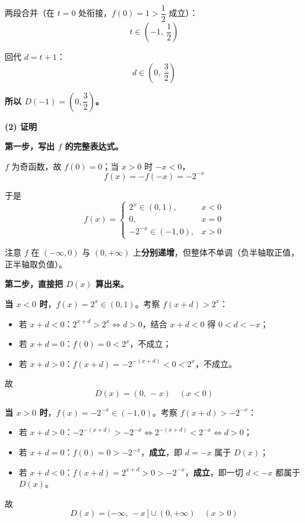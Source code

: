 \begin{answer}
两段合并（在 $t=0$ 处衔接，$f(0)=1>\dfrac12$ 成立）：
\nopagebreak[4]
\[t\in\left(-1,\ \frac12\right)\]

回代 $d=t+1$：
\nopagebreak[4]
\[d\in\left(0,\ \frac32\right)\]

\textbf{所以 $D(-1)=\left(0,\dfrac32\right)$。}

\par\medskip

\textbf{(2) 证明}

\textbf{第一步，写出 $f$ 的完整表达式。}

$f$ 为奇函数，故 $f(0)=0$；当 $x>0$ 时 $-x<0$，
\nopagebreak[4]
\[f(x)=-f(-x)=-2^{-x}\]

于是
\nopagebreak[4]
\[f(x)=\begin{cases}2^{x}\in(0,1),&x<0\\ 0,&x=0\\ -2^{-x}\in(-1,0),&x>0\end{cases}\]

注意 $f$ 在 $(-\infty,0)$ 与 $(0,+\infty)$ 上\textbf{分别递增}，但整体不单调（负半轴取正值，正半轴取负值）。

\textbf{第二步，直接把 $D(x)$ 算出来。}

\textbf{当 $x<0$ 时}，$f(x)=2^x\in(0,1)$。考察 $f(x+d)>2^x$：
\begin{itemize}
\item 若 $x+d<0$：$2^{x+d}>2^{x}\iff d>0$，结合 $x+d<0$ 得 $0<d<-x$；
\item 若 $x+d=0$：$f(0)=0<2^x$，不成立；
\item 若 $x+d>0$：$f(x+d)=-2^{-(x+d)}<0<2^{x}$，不成立。
\end{itemize}

故
\nopagebreak[4]
\[\boxed{D(x)=(0,\,-x)\quad(x<0)}\]

\textbf{当 $x>0$ 时}，$f(x)=-2^{-x}\in(-1,0)$。考察 $f(x+d)>-2^{-x}$：
\begin{itemize}
\item 若 $x+d>0$：$-2^{-(x+d)}>-2^{-x}\iff 2^{-(x+d)}<2^{-x}\iff d>0$；
\item 若 $x+d=0$：$f(0)=0>-2^{-x}$，\textbf{成立}，即 $d=-x$ 属于 $D(x)$；
\item 若 $x+d<0$：$f(x+d)=2^{x+d}>0>-2^{-x}$，\textbf{成立}，即一切 $d<-x$ 都属于 $D(x)$。
\end{itemize}

故
\nopagebreak[4]
\[\boxed{D(x)=(-\infty,\,-x\,]\cup(0,+\infty)\quad(x>0)}\]


\end{answer}
